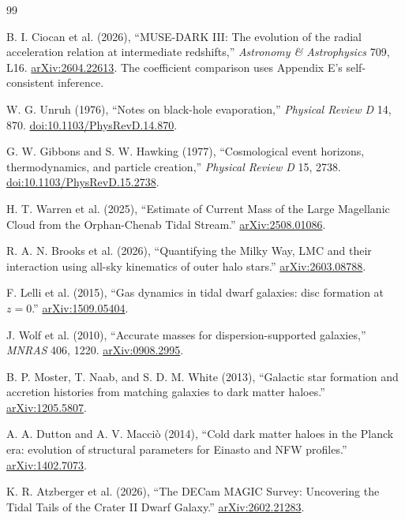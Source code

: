 \begin{thebibliography}{99}
\small

 B. I. Ciocan et al. (2026),
``MUSE-DARK III: The evolution of the radial acceleration relation at
intermediate redshifts,'' \emph{Astronomy \& Astrophysics} 709, L16.
\href{https://arxiv.org/abs/2604.22613}{arXiv:2604.22613}.
The coefficient comparison uses Appendix E's self-consistent inference.

 W. G. Unruh (1976), ``Notes on black-hole evaporation,''
\emph{Physical Review D} 14, 870.
\href{https://doi.org/10.1103/PhysRevD.14.870}{doi:10.1103/PhysRevD.14.870}.

 G. W. Gibbons and S. W. Hawking (1977),
``Cosmological event horizons, thermodynamics, and particle creation,''
\emph{Physical Review D} 15, 2738.
\href{https://doi.org/10.1103/PhysRevD.15.2738}{doi:10.1103/PhysRevD.15.2738}.

 H. T. Warren et al. (2025), ``Estimate of Current Mass
of the Large Magellanic Cloud from the Orphan-Chenab Tidal Stream.''
\href{https://arxiv.org/abs/2508.01086}{arXiv:2508.01086}.

 R. A. N. Brooks et al. (2026), ``Quantifying the
Milky Way, LMC and their interaction using all-sky kinematics of outer
halo stars.'' \href{https://arxiv.org/abs/2603.08788}{arXiv:2603.08788}.

 F. Lelli et al. (2015), ``Gas dynamics in tidal dwarf
galaxies: disc formation at $z=0$.''
\href{https://arxiv.org/abs/1509.05404}{arXiv:1509.05404}.

 J. Wolf et al. (2010), ``Accurate masses for
dispersion-supported galaxies,'' \emph{MNRAS} 406, 1220.
\href{https://arxiv.org/abs/0908.2995}{arXiv:0908.2995}.

 B. P. Moster, T. Naab, and S. D. M. White (2013),
``Galactic star formation and accretion histories from matching galaxies
to dark matter haloes.''
\href{https://arxiv.org/abs/1205.5807}{arXiv:1205.5807}.

 A. A. Dutton and A. V. Macci\`o (2014),
``Cold dark matter haloes in the Planck era: evolution of structural
parameters for Einasto and NFW profiles.''
\href{https://arxiv.org/abs/1402.7073}{arXiv:1402.7073}.

 K. R. Atzberger et al. (2026),
``The DECam MAGIC Survey: Uncovering the Tidal Tails of the Crater II
Dwarf Galaxy.''
\href{https://arxiv.org/abs/2602.21283}{arXiv:2602.21283}.


\end{thebibliography}
